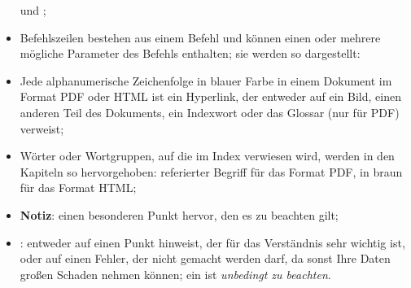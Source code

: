\begin{itemize}
		\newline
		\hspace*{1.5cm} und ;	
	\item Befehlszeilen bestehen aus einem Befehl und können einen oder mehrere mögliche Parameter des Befehls enthalten; sie werden so dargestellt:%
		\newline
		\hspace*{1.5cm}	
	\item Jede alphanumerische Zeichenfolge in blauer Farbe in einem Dokument im Format \gls{PDF} oder \gls{HTML} ist ein Hyperlink, der entweder auf ein Bild, einen anderen Teil des Dokuments, ein Indexwort oder das Glossar (nur für \gls{PDF}) verweist;%
	\item Wörter oder Wortgruppen, auf die im Index verwiesen wird, werden in den Kapiteln so hervorgehoben:%
		\newline
		\hspace*{1.5cm} \textopenbullet{}	\textsf{referierter Begriff} für das Format \gls{PDF}, %
		\newline 
		\hspace*{1.5cm} \textopenbullet{} in braun für das Format \gls{HTML};%
	\item \textbf{Notiz}: einen besonderen Punkt hervor, den es zu beachten gilt;
	\item \textcolor{red}{}: entweder auf einen Punkt hinweist, der für das Verständnis sehr wichtig ist, oder auf einen Fehler, der nicht gemacht werden darf, da sonst Ihre Daten großen Schaden nehmen können; ein \textcolor{red}{} ist \emph{unbedingt zu beachten}.
\end{itemize}


